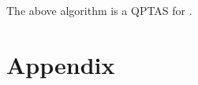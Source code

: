 \begin{theorem}
    The above algorithm is a QPTAS for \GMEC.
\end{theorem}


\newpage
\appendix
\section*{Appendix}
%
%
